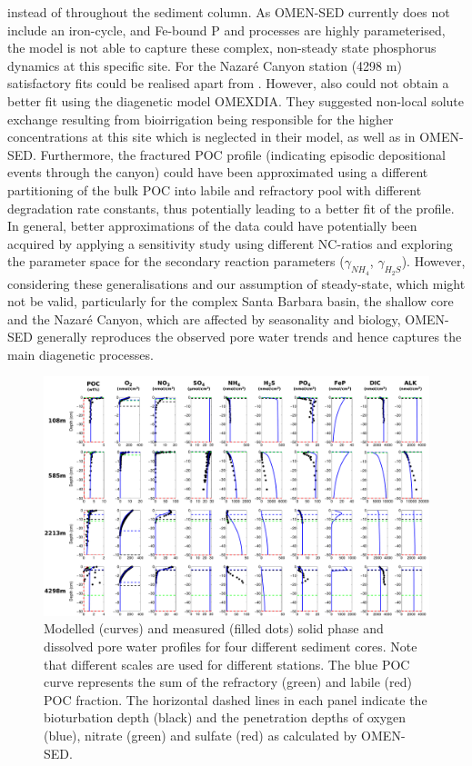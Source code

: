 \documentclass[gmd, manuscript]{copernicus}
\begin{document}
instead of throughout the sediment column. %
As OMEN-SED currently does not include an iron-cycle, and Fe-bound P and  processes are highly parameterised, the model is not able to capture these complex, non-steady state phosphorus 
dynamics at this specific site. 
For the Nazar\'e Canyon station (4298 m) satisfactory fits could be realised apart from . However, also \citet{epping_oxidation_2002} could not obtain a better fit 
using the diagenetic model OMEXDIA. They suggested non-local solute exchange resulting from bioirrigation being responsible for the higher  concentrations at this site which is neglected in their model, as well as in 
OMEN-SED. Furthermore, the fractured POC profile (indicating episodic depositional events through the canyon) could have been approximated using a different partitioning of the bulk POC into 
labile and refractory pool with different degradation rate constants, thus potentially leading to a better fit of the  profile.  
In general, better approximations of the data could have potentially been acquired by applying a sensitivity study using different NC-ratios \citep[e.g.][report different ratios from Redfield stoichiometry]{epping_oxidation_2002} 
and exploring the parameter space for the secondary reaction parameters ($\gamma_{NH_4}$, $\gamma_{H_2S}$). 
However, considering these generalisations and our assumption of steady-state, which might not be valid, particularly for the complex Santa Barbara basin, the shallow core and the Nazar\'e Canyon, which are affected by seasonality 
and biology, OMEN-SED generally reproduces the observed pore water trends and hence captures the main diagenetic processes. 

\begin{figure}
	\includegraphics[width=1.0\textwidth]{figures/Profiles/0_ALL_PROFILES_COMBINED_1503.pdf}
	\caption{Modelled (curves) and measured (filled dots) solid phase and dissolved pore water profiles for four different sediment cores. Note that different 
	scales are used for different stations. The blue POC curve represents the sum of the refractory (green) and labile (red) POC fraction. The horizontal dashed lines in each panel indicate the 
	bioturbation depth (black) and the penetration depths of oxygen (blue), nitrate (green) and sulfate (red) as calculated by OMEN-SED.}
	\label{fig:Sediment_profiles}
\end{figure}
\end{document}
